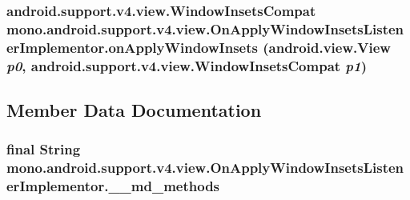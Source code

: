 \hypertarget{classmono_1_1android_1_1support_1_1v4_1_1view_1_1_on_apply_window_insets_listener_implementor_2230411e95dcf2d47b86e1b35d2e91ee}{
\subsubsection[{onApplyWindowInsets}]{\setlength{\rightskip}{0pt plus 5cm}android.support.v4.view.WindowInsetsCompat mono.android.support.v4.view.OnApplyWindowInsetsListenerImplementor.onApplyWindowInsets (android.view.View {\em p0}, \/  android.support.v4.view.WindowInsetsCompat {\em p1})}}
\label{classmono_1_1android_1_1support_1_1v4_1_1view_1_1_on_apply_window_insets_listener_implementor_2230411e95dcf2d47b86e1b35d2e91ee}




\subsection{Member Data Documentation}
\hypertarget{classmono_1_1android_1_1support_1_1v4_1_1view_1_1_on_apply_window_insets_listener_implementor_9d2e89b4e2dcf4aea44200c6427f14a4}{
\subsubsection[{\_\-\_\-md\_\-methods}]{\setlength{\rightskip}{0pt plus 5cm}final String {\bf mono.android.support.v4.view.OnApplyWindowInsetsListenerImplementor.\_\-\_\-md\_\-methods}}}
\label{classmono_1_1android_1_1support_1_1v4_1_1view_1_1_on_apply_window_insets_listener_implementor_9d2e89b4e2dcf4aea44200c6427f14a4}


